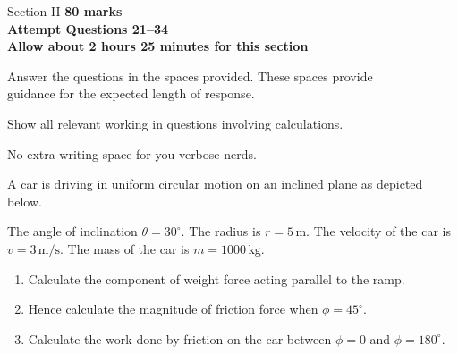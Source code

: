 \begin{sectionheader}{Section II}
    \textbf{80 marks\\
    Attempt Questions 21--34\\
    Allow about 2 hours 25 minutes for this section}
    
    Answer the questions in the spaces provided. These spaces provide\\ guidance for the expected length of response.
    
    Show all relevant working in questions involving calculations.

    No extra writing space for you verbose nerds.
\end{sectionheader}

\begin{shortanswer}         %

\begin{shortquestion}{6} %

A car is driving in uniform circular motion on an inclined plane as depicted below.
\begin{center}
    
\end{center}
    
The angle of inclination $\theta = 30^{\circ}$. The radius is $r = 5\,\si{\meter}$. The velocity of the car is $v = 3\,\si{\meter\per\second}$.
The mass of the car is $m = 1000\,\si{\kg}$.

\begin{enumerate}           %
    \item{} Calculate the component of weight force acting parallel to the ramp.
    \questionbreak
    \item{} Hence calculate the magnitude of friction force when $\phi = 45^{\circ}$.

    \item{} Calculate the work done by friction on the car between $\phi = 0$ and $\phi = 180^{\circ}$.
    
    \questionend                %
\end{enumerate}                 %
\end{shortquestion}           %


\end{shortanswer}
